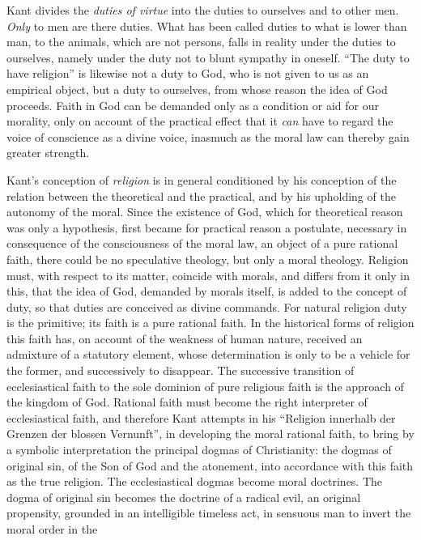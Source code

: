 Kant divides the \emph{duties of virtue} into the duties to ourselves
and to other men. \emph{Only} to men are there duties. What has been
called duties to what is lower than man, to the animals, which are not
persons, falls in reality under the duties to ourselves, namely under
the duty not to blunt sympathy in oneself. ``The duty to have religion''
is likewise not a duty to God, who is not given to us as an empirical
object, but a duty to ourselves, from whose reason the idea of God
proceeds. Faith in God can be demanded only as a condition or aid for
our morality, only on account of the practical effect that it \emph{can}
have to regard the voice of conscience as a divine voice, inasmuch as the
moral law can thereby gain greater strength.

\divrule

Kant's conception of \emph{religion} is in general conditioned by his
conception of the relation between the theoretical and the practical,
and by his upholding of the autonomy of the moral. Since the existence
of God, which for theoretical reason was only a hypothesis, first became
for practical reason a postulate, necessary in consequence of the
consciousness of the moral law, an object of a pure rational faith,
there could be no speculative theology, but only a moral theology.
Religion must, with respect to its matter, coincide with morals, and
differs from it only in this, that the idea of God, demanded by morals
itself, is added to the concept of duty, so that duties are conceived as
divine commands. For natural religion duty is the primitive; its faith
is a pure rational faith. In the historical forms of religion this faith
has, on account of the weakness of human nature, received an admixture
of a statutory element, whose determination is only to be a
vehicle for the former, and successively to disappear. The successive
transition of ecclesiastical faith to the sole dominion of pure
religious faith is the approach of the kingdom of God. Rational faith
must become the right interpreter of ecclesiastical faith, and therefore
Kant attempts in his ``Religion innerhalb der Grenzen der blossen
Vernunft'', in developing the moral rational faith, to bring by a
symbolic interpretation the principal dogmas of Christianity: the dogmas
of original sin, of the Son of God and the atonement, into accordance
with this faith as the true religion. The ecclesiastical dogmas become
moral doctrines. The dogma of original sin becomes the doctrine of a
radical evil, an original propensity, grounded in an intelligible
timeless act, in sensuous man to invert the moral order in the

